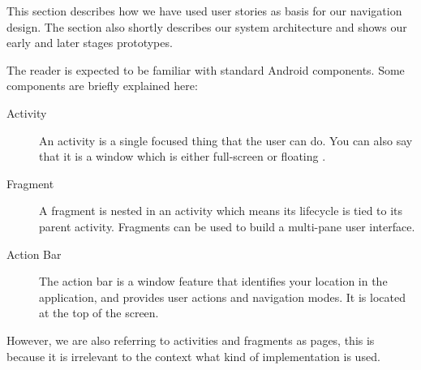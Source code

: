 This section describes how we have used user stories as basis for our navigation design. The section also shortly describes our system architecture and shows our early and later stages prototypes.

The reader is expected to be familiar with standard Android components. Some components are briefly explained here:
\begin{description}
\item[Activity] An activity is a single focused thing that the user can do. You can also say that it is a window which is either full-screen or floating \citep{activity}.
\item[Fragment] A fragment is nested in an activity which means its lifecycle is tied to its parent activity. Fragments can be used to build a multi-pane user interface\citep{fragment}.
\item[Action Bar] The action bar is a window feature that identifies your location in the application, and provides user actions and navigation modes. It is located at the top of the screen\citep{actionbar}.
\end{description}

However, we are also referring to activities and fragments as pages, this is because it is irrelevant to the context what kind of implementation is used.